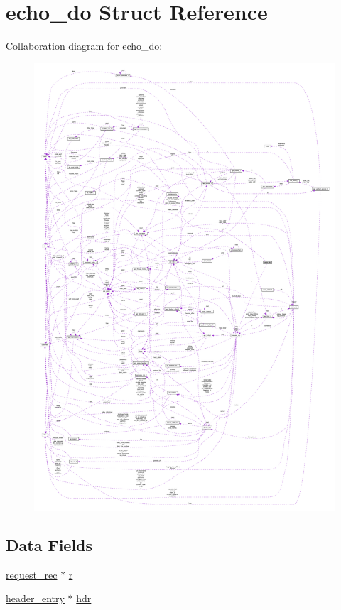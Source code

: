 \hypertarget{structecho__do}{}\section{echo\+\_\+do Struct Reference}
\label{structecho__do}


Collaboration diagram for echo\+\_\+do\+:
\nopagebreak
\begin{figure}[H]
\begin{center}
\leavevmode
\includegraphics[width=350pt]{structecho__do__coll__graph}
\end{center}
\end{figure}
\subsection*{Data Fields}
\begin{DoxyCompactItemize}
\item 
\hyperlink{structrequest__rec}{request\+\_\+rec} $\ast$ \hyperlink{structecho__do_a65c7735c0a4a3c9e143ee5f0e61be770}{r}
\item 
\hyperlink{structheader__entry}{header\+\_\+entry} $\ast$ \hyperlink{structecho__do_a5d3f6ad741a7565f94be5b71f8fa58da}{hdr}
\end{DoxyCompactItemize}


